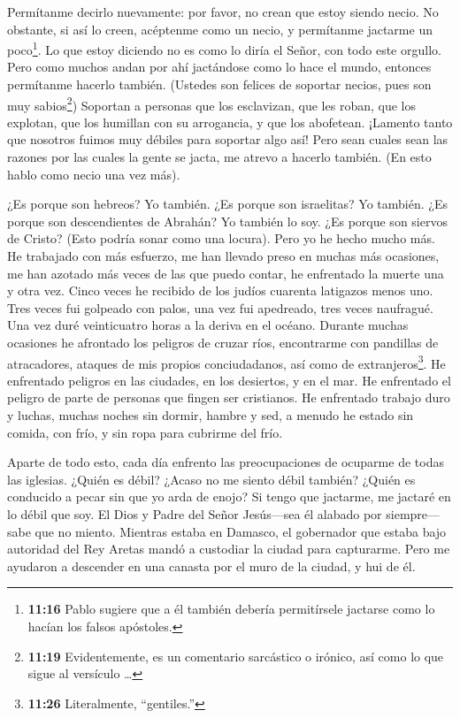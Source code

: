  Permítanme decirlo nuevamente: por favor, no crean que
estoy siendo necio. No obstante, si así lo creen, acéptenme como un
necio, y permítanme jactarme un poco\footnote{\textbf{11:16} Pablo
  sugiere que a él también debería permitírsele jactarse como lo hacían
  los falsos apóstoles.}.  Lo que estoy diciendo no es como
lo diría el Señor, con todo este orgullo.  Pero como muchos
andan por ahí jactándose como lo hace el mundo, entonces permítanme
hacerlo también.  (Ustedes son felices de soportar necios,
pues son muy sabios\footnote{\textbf{11:19} Evidentemente, es un
  comentario sarcástico o irónico, así como lo que sigue al versículo
  \ldots{}})  Soportan a personas que los esclavizan, que
les roban, que los explotan, que los humillan con su arrogancia, y que
los abofetean.  ¡Lamento tanto que nosotros fuimos muy
débiles para soportar algo así! Pero sean cuales sean las razones por
las cuales la gente se jacta, me atrevo a hacerlo también. (En esto
hablo como necio una vez más).

 ¿Es porque son hebreos? Yo también. ¿Es porque son
israelitas? Yo también. ¿Es porque son descendientes de Abrahán? Yo
también lo soy.  ¿Es porque son siervos de Cristo? (Esto
podría sonar como una locura). Pero yo he hecho mucho más. He trabajado
con más esfuerzo, me han llevado preso en muchas más ocasiones, me han
azotado más veces de las que puedo contar, he enfrentado la muerte una y
otra vez.  Cinco veces he recibido de los judíos cuarenta
latigazos menos uno.  Tres veces fui golpeado con palos,
una vez fui apedreado, tres veces naufragué. Una vez duré veinticuatro
horas a la deriva en el océano.  Durante muchas ocasiones
he afrontado los peligros de cruzar ríos, encontrarme con pandillas de
atracadores, ataques de mis propios conciudadanos, así como de
extranjeros\footnote{\textbf{11:26} Literalmente, ``gentiles.''}. He
enfrentado peligros en las ciudades, en los desiertos, y en el mar. He
enfrentado el peligro de parte de personas que fingen ser cristianos.
 He enfrentado trabajo duro y luchas, muchas noches sin
dormir, hambre y sed, a menudo he estado sin comida, con frío, y sin
ropa para cubrirme del frío.

 Aparte de todo esto, cada día enfrento las preocupaciones
de ocuparme de todas las iglesias.  ¿Quién es débil? ¿Acaso
no me siento débil también? ¿Quién es conducido a pecar sin que yo arda
de enojo?  Si tengo que jactarme, me jactaré en lo débil
que soy.  El Dios y Padre del Señor Jesús---sea él alabado
por siempre---sabe que no miento.  Mientras estaba en
Damasco, el gobernador que estaba bajo autoridad del Rey Aretas mandó a
custodiar la ciudad para capturarme.  Pero me ayudaron a
descender en una canasta por el muro de la ciudad, y hui de él.

